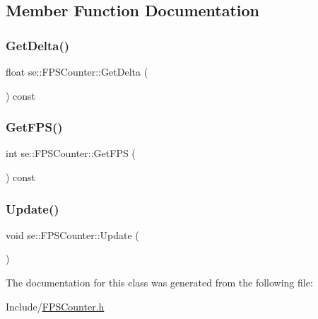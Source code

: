 \subsection{Member Function Documentation}
\mbox{\label{classse_1_1_f_p_s_counter_ac39be1bd1ff3954813d6d5733825abb1}} 
\subsubsection{\texorpdfstring{Get\+Delta()}{GetDelta()}}
{\footnotesize\ttfamily float se\+::\+F\+P\+S\+Counter\+::\+Get\+Delta (\begin{DoxyParamCaption}{ }\end{DoxyParamCaption}) const}

\mbox{\label{classse_1_1_f_p_s_counter_a6e3fc56e01f9696ce549264f6246fa01}} 
\subsubsection{\texorpdfstring{Get\+F\+P\+S()}{GetFPS()}}
{\footnotesize\ttfamily int se\+::\+F\+P\+S\+Counter\+::\+Get\+F\+PS (\begin{DoxyParamCaption}{ }\end{DoxyParamCaption}) const}

\mbox{\label{classse_1_1_f_p_s_counter_a863da58355d25fcf9f76b9cc697101e4}} 
\subsubsection{\texorpdfstring{Update()}{Update()}}
{\footnotesize\ttfamily void se\+::\+F\+P\+S\+Counter\+::\+Update (\begin{DoxyParamCaption}{ }\end{DoxyParamCaption})}



The documentation for this class was generated from the following file\+:\begin{DoxyCompactItemize}
\item 
Include/\mbox{\hyperlink{_f_p_s_counter_8h}{F\+P\+S\+Counter.\+h}}\end{DoxyCompactItemize}

